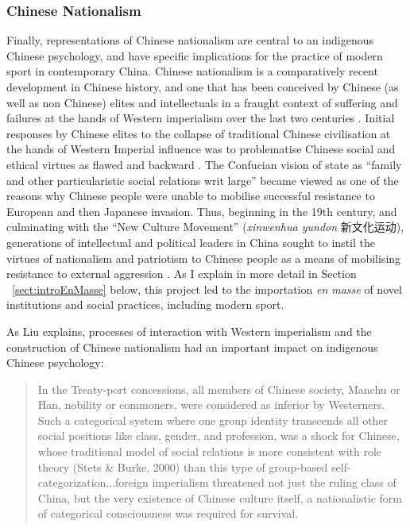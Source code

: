\begin{CJK}{UTF8}{gbsn}
\subsubsection{Chinese Nationalism}
Finally, representations of Chinese nationalism are central to an indigenous Chinese psychology, and have specific implications for the practice of modern sport in contemporary China.  Chinese nationalism is a comparatively recent development in Chinese history, and one that has been conceived by Chinese (as well as non Chinese) elites and intellectuals in a fraught context of suffering and failures at the hands of Western imperialism over the last two centuries \cite{Liu2009,Liu1995}.  Initial responses by Chinese elites to the collapse of traditional Chinese civilisation at the hands of Western Imperial influence was to problematise Chinese social and ethical virtues as flawed and backward \citep[see][]{Levenson1959}.  The Confucian vision of state as ``family and other particularistic social relations writ large'' became viewed as one of the reasons why Chinese people were unable to mobilise successful resistance to European and then Japanese invasion.  Thus, beginning in the 19th century, and culminating with the ``New Culture Movement'' (\textit{xinwenhua yundon} 新文化运动), generations of intellectual and political leaders in China sought to instil the virtues of nationalism and patriotism to Chinese people as a means of mobilising resistance to external aggression \citep{Pye1996}.  As I explain in more detail in Section ~\ref{sect:introEnMasse} below, this project led to the importation \textit{en masse} of novel institutions and social practices, including modern sport.

As Liu explains, processes of interaction with Western imperialism and the construction of Chinese nationalism had an important impact on indigenous Chinese psychology:

\begin{quotation}
  In the Treaty-port concessions, all members of Chinese society, Manchu or Han, nobility or commoners, were considered as inferior by Westerners.  Such a categorical system where one group identity transcends all other social positions like class, gender, and profession, was a shock for Chinese, whose traditional model of social relations is more consistent with role theory (Stets & Burke, 2000) than this type of group-based self-categorization...foreign imperialism threatened not just the ruling class of China, but the very existence of Chinese culture itself, a nationalistic form of categorical consciousness was required for survival.  \citep[584-5]{Liu2009}
\end{quotation}


\end{CJK}
